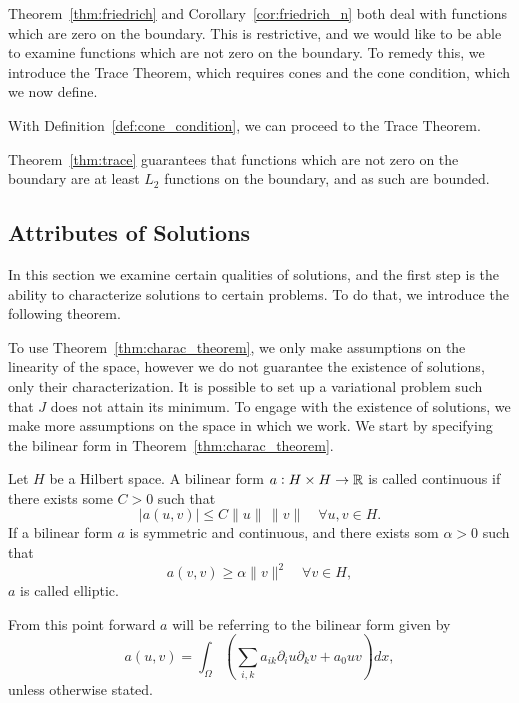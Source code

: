 
Theorem~\ref{thm:friedrich} and Corollary~\ref{cor:friedrich_n} both deal with 
functions which are zero on the boundary. 
This is restrictive, and we would like to be able to examine 
functions which are not zero on the boundary.
To remedy this, we introduce the Trace Theorem, which requires cones and the cone condition, which we now define.

With Definition~\ref{def:cone_condition}, we can proceed to the Trace Theorem.

Theorem~\ref{thm:trace} guarantees that functions which are not 
zero on the boundary are at least $L_2$ functions on the boundary, and as such are bounded. 
\subsection{Attributes of Solutions}
In this section we examine certain qualities of solutions, and the first step is 
the ability to characterize solutions to certain problems.
To do that, we introduce the following theorem.

To use Theorem~\ref{thm:charac_theorem}, we
only make assumptions on the linearity of the space, however we
do not guarantee the existence  of solutions, only their characterization.
It is possible to set up a variational problem such that $J$ does 
not attain its minimum.
To engage with the existence of solutions, we make more assumptions on 
the space in which we work.
We start by specifying the bilinear form in Theorem~\ref{thm:charac_theorem}.
\begin{defn}{\quad}
   Let $H$ be a Hilbert space. A bilinear form $a : H \times H \to \mathbb{R}$ is 
   called continuous if there exists some $C > 0$ such that 
   \begin{equation}
    |a(u,v)| \leq C \|u\|\, \|v\| \quad \forall u,v \in H.
   \end{equation} 
   If a bilinear form $a$ is symmetric and continuous, and there exists som $\alpha >0$ such that 
   \begin{equation*}
    a(v,v) \geq \alpha \|v\|^2 \quad \forall v \in H,
   \end{equation*}
   $a$ is called elliptic.\label{def:elliptic}
 \end{defn}
From this point forward $a$ will be referring to the bilinear form given by
\begin{equation}
   a(u,v) = \int_\Omega \left(\sum_{i,k} a_{ik}\partial_i u\partial_k v+a_0uv\right)dx,
\end{equation}
unless otherwise stated.


